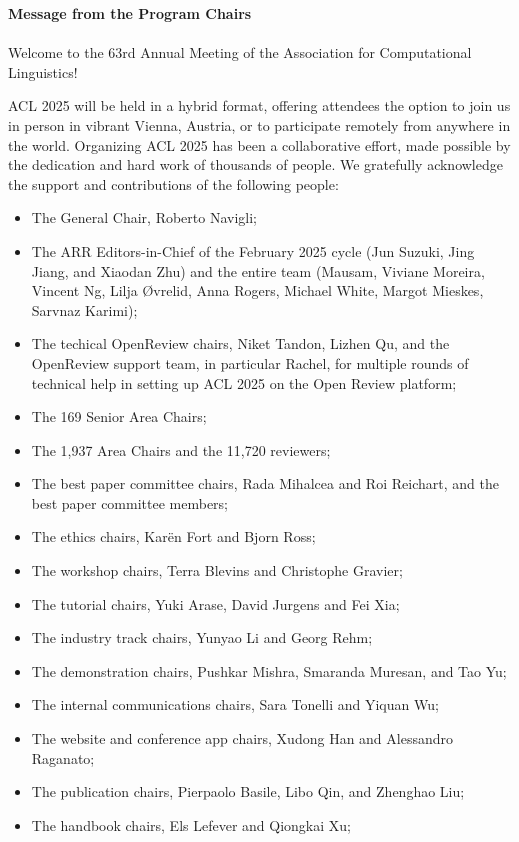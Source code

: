 \textbf{Message from the Program Chairs}\\
\\

Welcome to the 63rd Annual Meeting of the Association for Computational Linguistics!

ACL 2025 will be held in a hybrid format, offering attendees the option to join us in person in vibrant Vienna, Austria, or to participate remotely from anywhere in the world. Organizing ACL 2025 has been a collaborative effort, made possible by the dedication and hard work of thousands of people. We gratefully acknowledge the support and contributions of the following people:

\begin{itemize}
\item The General Chair, Roberto Navigli;
\item The ARR Editors-in-Chief of the February 2025 cycle (Jun Suzuki, Jing Jiang, and Xiaodan Zhu) and the entire team (Mausam, Viviane Moreira, Vincent Ng, Lilja Øvrelid, Anna Rogers, Michael White, Margot Mieskes, Sarvnaz Karimi);
\item The techical OpenReview chairs, Niket Tandon, Lizhen Qu, and the OpenReview support team, in particular Rachel, for multiple rounds of technical help in setting up ACL 2025 on the Open Review platform;
\item The 169 Senior Area Chairs;
\item The 1,937 Area Chairs and the 11,720  reviewers; 
\item The best paper committee chairs, Rada Mihalcea and Roi Reichart, and the best paper committee members; 
\item The ethics chairs, Karën Fort and Bjorn Ross; 
\item The workshop chairs, Terra Blevins and Christophe Gravier;
\item The tutorial chairs, Yuki Arase, David Jurgens and Fei Xia;
\item The industry track chairs, Yunyao Li and Georg Rehm;
\item The demonstration chairs, Pushkar Mishra, Smaranda Muresan, and Tao Yu;
\item The internal communications chairs, Sara Tonelli and Yiquan Wu;
\item The website and conference app chairs, Xudong Han and Alessandro Raganato; 
\item The publication chairs, Pierpaolo Basile, Libo Qin, and Zhenghao Liu;
\item The handbook chairs, Els Lefever and Qiongkai Xu;

\end{itemize}
